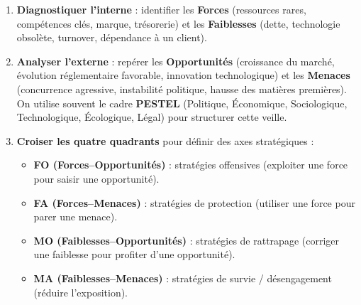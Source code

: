 \documentclass[11pt]{article}
\begin{document}
\begin{methode}
\begin{enumerate}
    \item \textbf{Diagnostiquer l'interne} : identifier les \textbf{Forces} (ressources rares, compétences clés, marque, trésorerie) et les \textbf{Faiblesses} (dette, technologie obsolète, turnover, dépendance à un client).
    \item \textbf{Analyser l'externe} : repérer les \textbf{Opportunités} (croissance du marché, évolution réglementaire favorable, innovation technologique) et les \textbf{Menaces} (concurrence agressive, instabilité politique, hausse des matières premières). On utilise souvent le cadre \textbf{PESTEL} (Politique, Économique, Sociologique, Technologique, Écologique, Légal) pour structurer cette veille.
    \item \textbf{Croiser les quatre quadrants} pour définir des axes stratégiques :
    \begin{itemize}
        \item \textbf{FO (Forces–Opportunités)} : stratégies offensives (exploiter une force pour saisir une opportunité).
        \item \textbf{FA (Forces–Menaces)} : stratégies de protection (utiliser une force pour parer une menace).
        \item \textbf{MO (Faiblesses–Opportunités)} : stratégies de rattrapage (corriger une faiblesse pour profiter d'une opportunité).
        \item \textbf{MA (Faiblesses–Menaces)} : stratégies de survie / désengagement (réduire l'exposition).
    \end{itemize}
\end{enumerate}
\end{methode}
\end{document}
